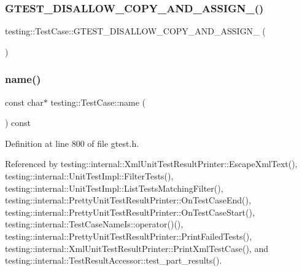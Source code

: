 \subsubsection{\texorpdfstring{G\+T\+E\+S\+T\+\_\+\+D\+I\+S\+A\+L\+L\+O\+W\+\_\+\+C\+O\+P\+Y\+\_\+\+A\+N\+D\+\_\+\+A\+S\+S\+I\+G\+N\+\_\+()}{GTEST\_DISALLOW\_COPY\_AND\_ASSIGN\_()}}
{\footnotesize\ttfamily testing\+::\+Test\+Case\+::\+G\+T\+E\+S\+T\+\_\+\+D\+I\+S\+A\+L\+L\+O\+W\+\_\+\+C\+O\+P\+Y\+\_\+\+A\+N\+D\+\_\+\+A\+S\+S\+I\+G\+N\+\_\+ (\begin{DoxyParamCaption}\item[{\hyperlink{classtesting_1_1TestCase}{Test\+Case}}]{ }\end{DoxyParamCaption})\hspace{0.3cm}{\ttfamily [private]}}

\mbox{\label{classtesting_1_1TestCase_a3f1beb98d5f7e3b037a4ec82b64cc1cf}} 
\subsubsection{\texorpdfstring{name()}{name()}}
{\footnotesize\ttfamily const char$\ast$ testing\+::\+Test\+Case\+::name (\begin{DoxyParamCaption}{ }\end{DoxyParamCaption}) const\hspace{0.3cm}{\ttfamily [inline]}}



Definition at line 800 of file gtest.\+h.



Referenced by testing\+::internal\+::\+Xml\+Unit\+Test\+Result\+Printer\+::\+Escape\+Xml\+Text(), testing\+::internal\+::\+Unit\+Test\+Impl\+::\+Filter\+Tests(), testing\+::internal\+::\+Unit\+Test\+Impl\+::\+List\+Tests\+Matching\+Filter(), testing\+::internal\+::\+Pretty\+Unit\+Test\+Result\+Printer\+::\+On\+Test\+Case\+End(), testing\+::internal\+::\+Pretty\+Unit\+Test\+Result\+Printer\+::\+On\+Test\+Case\+Start(), testing\+::internal\+::\+Test\+Case\+Name\+Is\+::operator()(), testing\+::internal\+::\+Pretty\+Unit\+Test\+Result\+Printer\+::\+Print\+Failed\+Tests(), testing\+::internal\+::\+Xml\+Unit\+Test\+Result\+Printer\+::\+Print\+Xml\+Test\+Case(), and testing\+::internal\+::\+Test\+Result\+Accessor\+::test\+\_\+part\+\_\+results().


